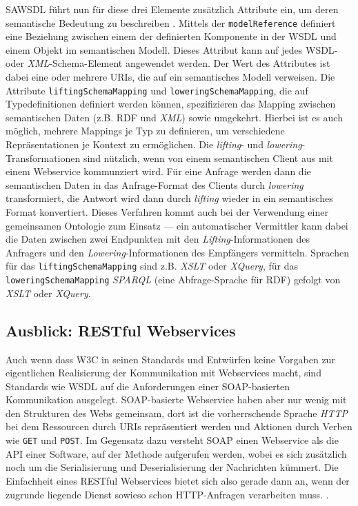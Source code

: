 \ac{SAWSDL} führt nun für diese drei Elemente zusätzlich Attribute ein, um deren semantische Bedeutung zu beschreiben \cite[S.62ff]{ky-sawsdl}. Mittels der 
\texttt{modelReference} definiert eine Beziehung zwischen einem der definierten Komponente in der \ac{WSDL} und einem Objekt im semantischen Modell. Dieses Attribut kann auf jedes \ac{WSDL}- oder \emph{XML}-Schema-Element angewendet werden. Der Wert des Attributes ist dabei eine oder mehrere URIs, die auf ein semantisches Modell verweisen. Die Attribute \texttt{liftingSchemaMapping} und \texttt{loweringSchemaMapping}, die auf Typedefinitionen definiert werden können, spezifizieren das Mapping zwischen semantischen Daten (z.B. \ac{RDF} und \emph{XML}) sowie umgekehrt. Hierbei ist es auch möglich, mehrere Mappings je Typ zu definieren, um verschiedene Repräsentationen je Kontext zu ermöglichen. Die \emph{lifting}- und \emph{lowering}-Transformationen sind nützlich, wenn von einem semantischen Client aus mit einem Webservice kommunziert wird. Für eine Anfrage werden dann die semantischen Daten in das Anfrage-Format des Clients durch \emph{lowering} transformiert, die Antwort wird dann durch \emph{lifting} wieder in ein semantisches Format konvertiert. Dieses Verfahren kommt auch bei der Verwendung einer gemeinsamen Ontologie zum Einsatz --- ein automatischer Vermittler kann dabei die Daten zwischen zwei Endpunkten mit den \emph{Lifting}-Informationen des Anfragers und den \emph{Lowering}-Informationen des Empfängers vermitteln. Sprachen für das \texttt{liftingSchemaMapping} sind z.B. \emph{XSLT} oder \emph{XQuery}, für das \texttt{loweringSchemaMapping} \emph{SPARQL} (eine Abfrage-Sprache für \ac{RDF}) gefolgt von \emph{XSLT} oder \emph{XQuery}.

\subsection*{Ausblick: RESTful Webservices}

Auch wenn dass \ac{W3C} in seinen Standards und Entwürfen keine Vorgaben zur eigentlichen Realisierung der Kommunikation mit Webservices macht, sind Standards wie \ac{WSDL} auf die Anforderungen einer \ac{SOAP}-basierten Kommunikation ausgelegt. \ac{SOAP}-basierte Webservice haben aber nur wenig mit den Strukturen des Webs gemeinsam, dort ist die vorherrschende Sprache \emph{HTTP} bei dem Ressourcen durch URIs repräsentiert werden und Aktionen durch Verben wie \texttt{GET} und \texttt{POST}. Im Gegensatz dazu versteht \ac{SOAP} einen Webservice als die \ac{API} einer Software, auf der Methode aufgerufen werden, wobei es sich zusätzlich noch um die Serialisierung und Deserialisierung der Nachrichten kümmert. Die Einfachheit eines RESTful Webservices bietet sich also gerade dann an, wenn der zugrunde liegende Dienst sowieso schon HTTP-Anfragen verarbeiten muss. \cite[S.18]{xn-sss}.

